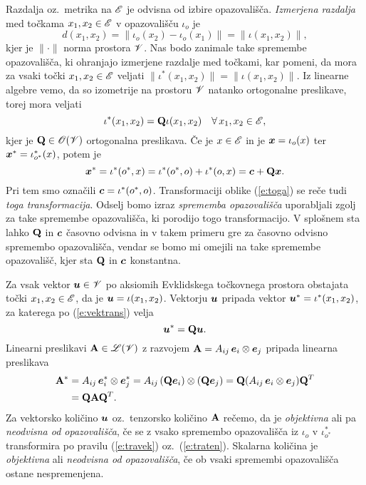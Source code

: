 Razdalja oz.~metrika na $\mathscr E$ je odvisna od izbire opazovališča. \emph{Izmerjena razdalja} med točkama
$x_1,x_2\in\mathscr E$ v opazovališču $\iota_o$ je
\[ d(x_1,x_2)=\|\iota_o(x_2)-\iota_o(x_1)\|=\|\iota(x_1,x_2)\|, \]
kjer je $\|\cdot\|$ norma prostora $\mathscr V$. Nas bodo zanimale take
spremembe opazovališča, ki ohranjajo izmerjene razdalje med točkami, kar pomeni,
da mora za vsaki točki $x_1,x_2\in\mathscr E$ veljati
$\|\iota^*(x_1,x_2)\|=\|\iota(x_1,x_2)\|$.
Iz linearne algebre vemo, da so izometrije na prostoru $\mathscr V$ natanko ortogonalne preslikave,
torej mora veljati
\begin{equation} \label{e:vektrans}
	\iota^*(x_1,x_2)=\mathbf Q\iota(x_1,x_2)\quad\forall\, x_1,x_2\in\mathscr E,
\end{equation}
kjer je $\mathbf Q\in\mathscr{O}(\mathscr V)$ ortogonalna preslikava. Če je $x\in\mathscr E$ in
je $\boldsymbol x=\iota_o(x)$ ter $\boldsymbol x^*=\iota^*_{o^*}(x)$, potem je
\begin{equation} \label{e:toga}
	\boldsymbol x^*=\iota^*(o^*,x)=\iota^*(o^*,o)+\iota^*(o,x)=\boldsymbol c+\mathbf Q\boldsymbol x.
\end{equation}
Pri tem smo označili $\boldsymbol c=\iota^*(o^*,o)$. Transformaciji oblike (\ref{e:toga})
se reče tudi \emph{toga transformacija}. Odselj bomo izraz \textit{sprememba opazovališča}
uporabljali zgolj za take spremembe opazovališča, ki porodijo togo transformacijo.
V splošnem sta lahko $\mathbf Q$ in $\boldsymbol c$ časovno odvisna in v takem primeru
gre za časovno odvisno spremembo opazovališča, vendar se bomo mi omejili na
take spremembe opazovališč, kjer sta $\mathbf Q$ in $\boldsymbol c$ konstantna.

Za vsak vektor $\boldsymbol u\in\mathscr V$ po aksiomih Evklidskega točkovnega prostora obstajata
točki $x_1,x_2\in\mathscr E$, da je $\boldsymbol u=\iota(x_1,x_2)$. Vektorju $\boldsymbol u$ pripada
vektor $\boldsymbol u^*=\iota^*(x_1,x_2)$, za katerega po (\ref{e:vektrans}) velja
\begin{equation} \label{e:travek}
	\boldsymbol u^*=\mathbf Q\boldsymbol u.
\end{equation}
Linearni preslikavi $\mathbf A\in\mathscr L(\mathscr V)$ z razvojem $\mathbf A=A_{ij}\,\boldsymbol e_i\otimes\boldsymbol e_j$
pripada linearna preslikava
\begin{align}
	\mathbf A^*&=A_{ij}\,\boldsymbol e^*_i\otimes\boldsymbol e^*_j=A_{ij}\,(\mathbf Q\boldsymbol e_i)\otimes(\mathbf Q\boldsymbol e_j)
	=\mathbf Q(A_{ij}\,\boldsymbol e_i\otimes\boldsymbol e_j)\mathbf Q^T \nonumber \\
	&=\mathbf Q\mathbf A\mathbf Q^T. \label{e:traten}
\end{align}
Za vektorsko količino $\boldsymbol u$ oz.~tenzorsko količino $\mathbf A$
rečemo, da je \emph{objektivna} ali pa \emph{neodvisna od opazovališča},
če se z vsako spremembo opazovališča iz $\iota_o$ v $\iota^*_{o^*}$
transformira po pravilu (\ref{e:travek}) oz.~(\ref{e:traten}).
Skalarna količina je \emph{objektivna} ali \emph{neodvisna od opazovališča},
če ob vsaki spremembi opazovališča ostane nespremenjena.

